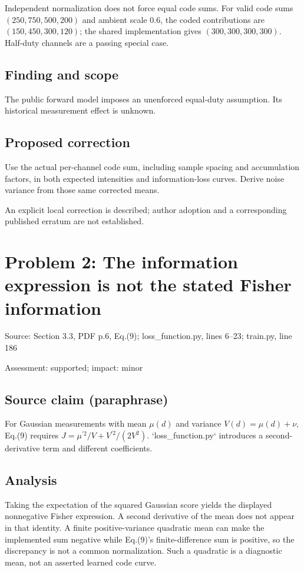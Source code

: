 \documentclass[11pt]{article}
\begin{document}
Independent normalization does not force equal code sums. For valid code sums \((250,750,500,200)\) and ambient scale \(0.6\), the coded contributions are \((150,450,300,120)\); the shared implementation gives \((300,300,300,300)\). Half-duty channels are a passing special case.

\subsection*{Finding and scope}

The public forward model imposes an unenforced equal-duty assumption. Its historical measurement effect is unknown.

\subsection*{Proposed correction}

Use the actual per-channel code sum, including sample spacing and accumulation factors, in both expected intensities and information-loss curves. Derive noise variance from those same corrected means.

An explicit local correction is described; author adoption and a corresponding published erratum are not established.

\section*{Problem 2: The information expression is not the stated Fisher information}

Source: Section 3.3, PDF p.6, Eq.(9); loss\_function.py, lines 6–23; train.py, line 186

Assessment: supported; impact: minor

\subsection*{Source claim (paraphrase)}

For Gaussian measurements with mean \(\mu(d)\) and variance \(V(d)=\mu(d)+\nu\), Eq.(9) requires \(J=\mu^{\prime2}/V+V^{\prime2}/(2V^2)\). `loss\_function.py` introduces a second-derivative term and different coefficients.

\subsection*{Analysis}

Taking the expectation of the squared Gaussian score yields the displayed nonnegative Fisher expression. A second derivative of the mean does not appear in that identity. A finite positive-variance quadratic mean can make the implemented sum negative while Eq.(9)’s finite-difference sum is positive, so the discrepancy is not a common normalization. Such a quadratic is a diagnostic mean, not an asserted learned code curve.
\end{document}
